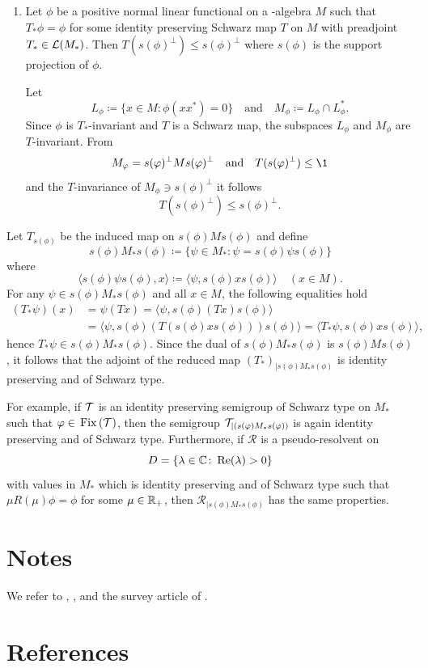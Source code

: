 \begin{enumerate}[1., wide, labelindent=.25em]
\item
Let $ \phi $ be a positive normal linear functional on a \WA-algebra $ M $ such that $ T_{*}\phi = \phi $ for some identity preserving Schwarz map $ T $ on $ M $ with preadjoint 
$ T_{*} \in \mathcal{L}(M_{*}) $.
Then $ T(s(\phi)^{\perp}) \leq s(\phi)^{\perp} $ where $ s(\phi) $ is the support projection of\/ $ \phi $.

Let 
%
\[
	L_\phi \coloneq \{ x \in M \colon \phi(xx^{*}) = 0 \}
	\quad \text{and} \quad
	M_\phi \coloneq L_\phi \cap L_\phi^{*} .
\]
%
Since $ \phi $ is $ T_{*} $-invariant and $ T $ is a Schwarz map, the subspaces $ L_{\phi} $ and $ M_{\phi} $ are $ T $-invariant.
From 
\[ 
M_{\phi} = s(\phi)^{\perp}Ms(\phi)^{\perp} 
\quad \text{and} \quad 
T(s(\phi)^{\perp}) \leq \1 
\]
and the $ T $-invariance of\/ $ M_{\phi} \ni s(\phi)^{\perp} $ it follows 
\[ 
T(s(\phi)^{\perp}) \leq s(\phi)^{\perp}  .
\]
\end{enumerate}
Let $ T_{s(\phi)} $ be the induced map on $ s(\phi)Ms(\phi) $ and define
\[
	s(\phi)M_{*}s(\phi) \coloneq \{\psi \in M_{*} \colon \psi = s(\phi)\psi s(\phi)\}
\]
where 
\[ 
\langle s(\phi)\psi s(\phi),x \rangle \coloneq 
    \langle \psi,s(\phi)xs(\phi) \rangle \quad  (  x \in M  ).
\]
For any $\psi \in s(\phi)M_{*}s(\phi)$ and all $x \in M$, the following equalities hold
\begin{align*}
(T_{*}\psi)(x) &= \psi(Tx) = \langle \psi,s(\phi)(Tx)s(\phi) \rangle \\
	&= \langle \psi,s(\phi)(T(s(\phi)xs(\phi)))s(\phi) \rangle = \langle T_{*}\psi,s(\phi)xs(\phi) \rangle,
\end{align*}
hence $ T_{*}\psi \in s(\phi)M_{*}s(\phi) $.
Since the dual of\/ $ s(\phi)M_{*}s(\phi) $ is $ s(\phi)Ms(\phi) $, it follows that the adjoint of the reduced map $ (T_{*})_{| s(\phi)M_{*}s(\phi)} $ is identity preserving and of Schwarz type.

For example, if\/ $ \mathcal{T} $ is an identity preserving semigroup of Schwarz type on $ M_{*} $ such that $ \phi \in \Fix{\TT} $, then the semigroup $ \TT_{\vert (s(\phi)M_{*}s(\phi))} $ is again identity preserving and of Schwarz type.
Furthermore, if  $ \mathcal{R} $ is a pseudo-resolvent on 
%
\[
	D = \{\lambda \in \mathbb{C} \colon \mathop{}\!\mathrm{Re}(\lambda) > 0\} 
\]
%
with values in $ M_{*} $ which is identity preserving and of Schwarz type such that $ \mu R(\mu)\phi = \phi $ for some $ \mu \in \mathbb{R}_{+} $, then $ \mathcal{R}_{\vert s(\phi)M_{*}s(\phi)} $ has the same properties.

\section*{Notes}
We refer to \textcite{brattelirobinson:1979}, \textcite{brattelirobinson:1981}, \textcite{davies:1976} and the survey article of \textcite{oseledets:1984}.
\section*{References}
{\RaggedRight
  \printbibliography[heading=none]
 }